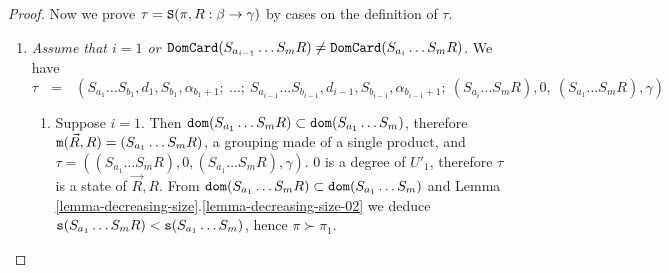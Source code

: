 \documentclass{lmcs}
\begin{document}
\begin{proof}


Now we prove $\tau = {\tt S}(\pi,R:\beta \rightarrow \gamma) $ by cases on the definition of $\tau$.


\begin{enumerate}

\item 
\emph{Assume that $i=1$ or 
${\tt DomCard}(S_{a_{i-1}} \ldots S_{m} R) \not = {\tt DomCard}(S_{a_i} \ldots S_{m}R)$}. 
We have
$$
\tau
\ \ \ = \ \ \ 
(S_{a_1} \ldots S_{b_1}, d_1, S_{b_1},\alpha_{b_1+1}; 
\ \ldots; 
\ S_{a_{i-1}} \ldots S_{b_{i-1}}, d_{i-1}, S_{b_{i-1}},\alpha_{b_{i-1}+1}; 
\ (S_{a_i} \ldots S_{m}R), 0, \ (S_{a_1} \ldots S_{m}R),\gamma)
$$

\begin{enumerate}
\item
Suppose $i=1$. Then ${\tt dom}(S_{a_1} \ldots S_{m} R) \subset {\tt dom}(S_{a_1} \ldots S_{m})$, 
therefore ${\tt m}(\vec{R},R) = (S_{a_1} \ldots S_m  R)$, a grouping made of a single 
product, and $\tau = ((S_{a_1} \ldots S_m  R), 0, (S_{a_1} \ldots S_m  R), \gamma)$. 
$0$ is a degree of $U'_1$, therefore $\tau$ 
is a state of $\vec{R},R$. 
From ${\tt dom}(S_{a_1} \ldots S_m  R) \subset {\tt dom}(S_{a_1} \ldots S_m )$ 
and Lemma \ref{lemma-decreasing-size}.\ref{lemma-decreasing-size-02}
we deduce ${\tt s}(S_{a_1} \ldots S_m  R) < {\tt s}(S_{a_1} \ldots S_m)$, 
hence $\pi \succ \pi_1$. 


\end{enumerate}
\end{enumerate}
\end{proof}
\end{document}
